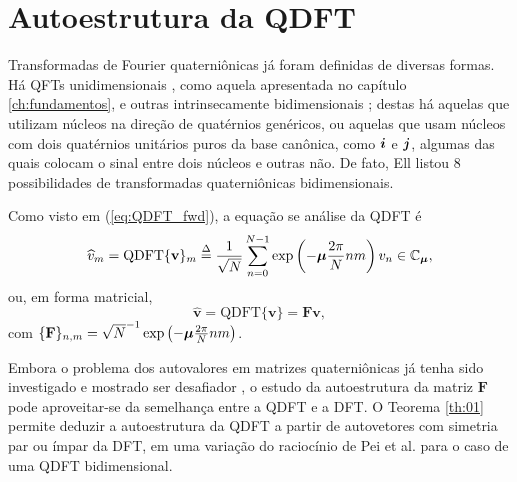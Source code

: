 

\section{Autoestrutura da QDFT}
\label{sec:autoestrutura}
Transformadas de Fourier quaterni\^onicas j\'a foram definidas de diversas formas. H\'a QFTs unidimensionais \cite{flamant2017spectral}, como aquela apresentada no cap\'itulo \ref{ch:fundamentos}, e outras intrinsecamente bidimensionais \cite{guanlei2008fractional}; destas h\'a aquelas que utilizam n\'ucleos na dire\c c\~ao de quat\'ernios gen\'ericos, ou aquelas que usam n\'ucleos com dois quat\'ernios unit\'arios puros da base can\^onica, como $ \boldsymbol{i} $ e $ \boldsymbol{j} $, algumas das quais colocam o sinal entre dois n\'ucleos e outras n\~ao. De fato, Ell \cite[sec. 3.2]{ell2014quaternion} listou 8 possibilidades de transformadas quaterni\^onicas bidimensionais.

Como visto em (\ref{eq:QDFT_fwd}), a equa\c c\~ao se an\'alise da QDFT \'e
\begin{equation}
\widehat{v}_m = \text{QDFT}\{ \mathbf{v} \}_m \overset{\Delta}{=} \frac{1}{\sqrt{N}} \sum_{n=0}^{N-1}  \exp \left( -\boldsymbol{\mu} \frac{2\pi}{N} nm \right) v_n \in \mathbb{C}_{\boldsymbol{\mu}},
\end{equation}
ou, em forma matricial,
\begin{equation}
\widehat{\mathbf{v}} = \text{QDFT}\{ \mathbf{v} \} = \mathbf{F} \mathbf{v},
\end{equation}
com $ \{\mathbf{F}\}_{n,m} = \sqrt{N}^{-1} \exp \left( -\boldsymbol{\mu} \frac{2\pi}{N} nm \right)$.

Embora o problema dos autovalores em matrizes quaterni\^onicas j\'a tenha sido investigado e mostrado ser desafiador \cite{de2002quaternionic,flaut2002eigenvalues,jiang2004algorithm,farid2011eigenvalues}, o estudo da autoestrutura da matriz $ \mathbf{F} $ pode aproveitar-se da semelhan\c ca entre a QDFT e a DFT. O Teorema \ref{th:01} permite deduzir a autoestrutura da QDFT a partir de autovetores com simetria par ou \'impar da DFT, em uma varia\c c\~ao do racioc\'inio de Pei et al. \cite{pei2010eigenfunctions} para o caso de uma QDFT bidimensional.


